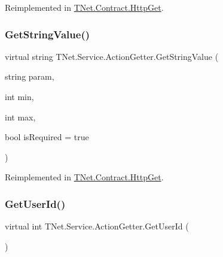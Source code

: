 Reimplemented in \mbox{\hyperlink{class_t_net_1_1_contract_1_1_http_get_a3a699f22e9dc9e02263097ebb345097c}{T\+Net.\+Contract.\+Http\+Get}}.

\mbox{\label{class_t_net_1_1_service_1_1_action_getter_a9e6191c6c968b4f7a106ed638f599c36}} 
\subsubsection{\texorpdfstring{Get\+String\+Value()}{GetStringValue()}\hspace{0.1cm}{\footnotesize\ttfamily [2/2]}}
{\footnotesize\ttfamily virtual string T\+Net.\+Service.\+Action\+Getter.\+Get\+String\+Value (\begin{DoxyParamCaption}\item[{string}]{param,  }\item[{int}]{min,  }\item[{int}]{max,  }\item[{bool}]{is\+Required = {\ttfamily true} }\end{DoxyParamCaption})\hspace{0.3cm}{\ttfamily [virtual]}}







Reimplemented in \mbox{\hyperlink{class_t_net_1_1_contract_1_1_http_get_a4c59458094b5b47c7753d78ab9844c8a}{T\+Net.\+Contract.\+Http\+Get}}.

\mbox{\label{class_t_net_1_1_service_1_1_action_getter_acb84776850a854df5baeefa4738da0c8}} 
\subsubsection{\texorpdfstring{Get\+User\+Id()}{GetUserId()}}
{\footnotesize\ttfamily virtual int T\+Net.\+Service.\+Action\+Getter.\+Get\+User\+Id (\begin{DoxyParamCaption}{ }\end{DoxyParamCaption})\hspace{0.3cm}{\ttfamily [virtual]}}



